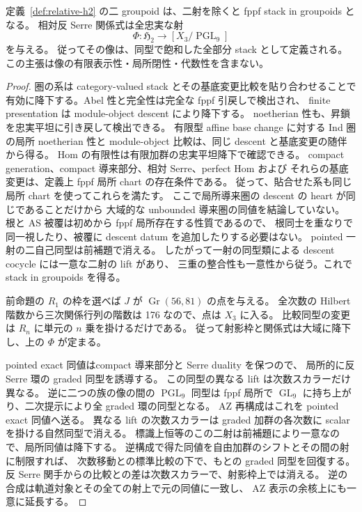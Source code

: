 \begin{proposition}
\label{prop:relative-h2-stack-recognition}
定義~\ref{def:relative-h2} の二 groupoid は、二射を除くと
fppf stack in groupoids となる。
相対反 Serre 関係式は全忠実な射
\[
 \Phi:\mathfrak H_2\longrightarrow[X_3/\operatorname{PGL}_9]
\]
を与える。
従ってその像は、同型で飽和した全部分 stack として定義される。
この主張は像の有限表示性・局所閉性・代数性を含まない。
\end{proposition}
\begin{proof}
圏の系は category-valued stack とその基底変更比較を貼り合わせることで
有効に降下する。Abel 性と完全性は完全な fppf 引戻しで検出され、
finite presentation は module-object descent により降下する。
noetherian 性も、昇鎖を忠実平坦に引き戻して検出できる。
有限型 affine base change に対する Ind 圏の局所 noetherian 性と
module-object 比較は、同じ descent と基底変更の随伴から得る。
Hom の有限性は有限加群の忠実平坦降下で確認できる。
compact generation、compact 導来部分、相対 Serre、perfect Hom および
それらの基底変更は、定義上 fppf 局所 chart の存在条件である。
従って、貼合せた系も同じ局所 chart を使ってこれらを満たす。
ここで局所導来圏の descent の heart が同じであることだけから
大域的な unbounded 導来圏の同値を結論していない。
根と AS 被覆は初めから fppf 局所存在する性質であるので、
根同士を重なりで同一視したり、被覆に descent datum を追加したりする必要はない。
pointed 一射の二自己同型は前補題で消える。
したがって一射の同型類による descent cocycle には一意な二射の lift があり、
三重の整合性も一意性から従う。これで stack in groupoids を得る。

前命題の $R_1$ の枠を選べば $J$ が $\operatorname{Gr}(56,81)$ の点を与える。
全次数の Hilbert 階数から三次関係行列の階数は 176 なので、点は $X_3$ に入る。
比較同型の変更は $R_n$ に単元の $n$ 乗を掛けるだけである。
従って射影枠と関係式は大域に降下し、上の $\Phi$ が定まる。

pointed exact 同値はcompact 導来部分と Serre duality を保つので、
局所的に反 Serre 環の graded 同型を誘導する。
この同型の異なる lift は次数スカラーだけ異なる。
逆に二つの族の像の間の $\operatorname{PGL}_9$ 同型は fppf 局所で
$\operatorname{GL}_9$ に持ち上がり、二次提示により全 graded 環の同型となる。
AZ 再構成はこれを pointed exact 同値へ送る。
異なる lift の次数スカラーは graded 加群の各次数に scalar を掛ける自然同型で消える。
標識上恒等のこの二射は前補題により一意なので、局所同値は降下する。
逆構成で得た同値を自由加群のシフトとその間の射に制限すれば、
次数移動との標準比較の下で、もとの graded 同型を回復する。
反 Serre 関手からの比較との差は次数スカラーで、射影枠上では消える。
逆の合成は軌道対象とその全ての射上で元の同値に一致し、
AZ 表示の余核上にも一意に延長する。
\end{proof}

